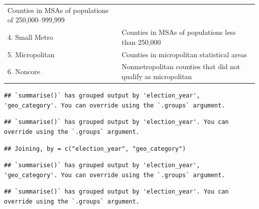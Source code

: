 \documentclass[10pt,]{article}
\begin{document}
\begin{longtable}[]{@{}ll@{}}
\begin{minipage}[t]{0.87\columnwidth}
Counties in MSAs of populations of 250,000--999,999\strut
\end{minipage}\tabularnewline
\begin{minipage}[t]{0.07\columnwidth}\raggedright
4. Small Metro\strut
\end{minipage} & \begin{minipage}[t]{0.87\columnwidth}\raggedright
Counties in MSAs of populations less than 250,000\strut
\end{minipage}\tabularnewline
\begin{minipage}[t]{0.07\columnwidth}\raggedright
5. Micropolitan\strut
\end{minipage} & \begin{minipage}[t]{0.87\columnwidth}\raggedright
Counties in micropolitan statistical areas\strut
\end{minipage}\tabularnewline
\begin{minipage}[t]{0.07\columnwidth}\raggedright
6. Noncore\strut
\end{minipage} & \begin{minipage}[t]{0.87\columnwidth}\raggedright
Nonmetropolitan counties that did not qualify as micropolitan\strut
\end{minipage}\tabularnewline
\bottomrule
\end{longtable}

\begin{verbatim}
## `summarise()` has grouped output by 'election_year', 'geo_category'. You can override using the `.groups` argument.
\end{verbatim}

\begin{verbatim}
## `summarise()` has grouped output by 'election_year'. You can override using the `.groups` argument.
\end{verbatim}

\begin{verbatim}
## Joining, by = c("election_year", "geo_category")
\end{verbatim}

\begin{verbatim}
## `summarise()` has grouped output by 'election_year', 'geo_category'. You can override using the `.groups` argument.
\end{verbatim}

\begin{verbatim}
## `summarise()` has grouped output by 'election_year'. You can override using the `.groups` argument.
\end{verbatim}
\end{document}
